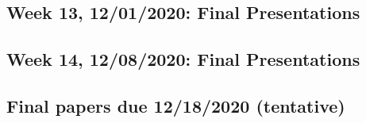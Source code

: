 \documentclass[11pt,]{article}
\begin{document}
\medskip

\hypertarget{week-13-12012020-final-presentations}{%
\subsection{Week 13, 12/01/2020: Final
Presentations}\label{week-13-12012020-final-presentations}}

\medskip

\hypertarget{week-14-12082020-final-presentations}{%
\subsection{Week 14, 12/08/2020: Final
Presentations}\label{week-14-12082020-final-presentations}}

\medskip

\hypertarget{final-papers-due-12182020-tentative}{%
\subsection{Final papers due 12/18/2020
(tentative)}\label{final-papers-due-12182020-tentative}}
\end{document}
